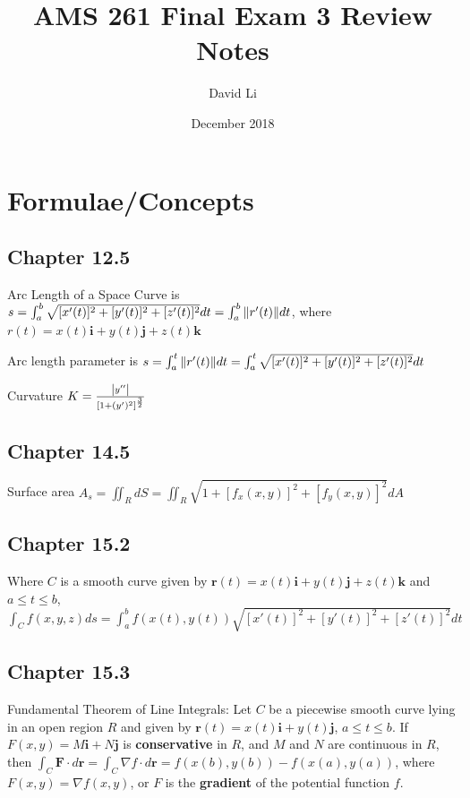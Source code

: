 \documentclass{article}
\title{AMS 261 Final Exam 3 Review Notes}
\author{David Li}
\date{December 2018}
\begin{document}
\maketitle

\section{Formulae/Concepts}

\subsection{Chapter 12.5}
\par\noindent\Large Arc Length of a Space Curve is $s = \int_{a}^{b}\sqrt{[x'(t)]^{2} + [y'(t)]^{2} + [z'(t)]^{2}}dt = \int_{a}^{b}\norm{r'(t)}dt$, where $r(t) = x(t)\textbf{i} + y(t)\textbf{j} + z(t)\textbf{k}$

\par\noindent\Large Arc length parameter is $s = \int_{a}^{t}\norm{r'(t)}dt = \int_{a}^{t}\sqrt{[x'(t)]^{2} + [y'(t)]^{2} + [z'(t)]^{2}}dt$\vspace{0.25cm}

\par\noindent\Large Curvature $K = \frac{\abs{y''}}{[1 + (y')^{2}]^{\frac{3}{2}}}$

\subsection{Chapter 14.5}
\par\noindent\Large Surface area $A_{s} = \iint_{R}dS = \iint_{R}\sqrt{1 + [f_{x}(x, y)]^{2} + [f_{y}(x, y)]^{2}}dA$

\subsection{Chapter 15.2}
\par\noindent\Large Where $C$ is a smooth curve given by $\textbf{r}(t) = x(t)\textbf{i} + y(t)\textbf{j} + z(t)\textbf{k}$ and $a \leq t \leq b$, $\int_{C}f(x, y, z)ds = \int_{a}^{b}f(x(t), y(t))\sqrt{[x'(t)]^{2} + [y'(t)]^{2} + [z'(t)]^{2}}dt$

\subsection{Chapter 15.3}
\par\noindent\Large Fundamental Theorem of Line Integrals: Let $C$ be a piecewise smooth curve lying in an open region $R$ and given by $\textbf{r}(t) = x(t)\textbf{i} + y(t)\textbf{j}$, $a \leq t \leq b$.  If $F(x, y) = M\textbf{i} + N\textbf{j}$ is \textbf{conservative} in $R$, and $M$ and $N$ are continuous in $R$, then $\int_{C}\textbf{F}\cdot d\textbf{r} = \int_{C}\nabla f\cdot d\textbf{r} = f(x(b), y(b)) - f(x(a), y(a))$, where $F(x, y) = \nabla f(x, y)$, or $F$ is the \textbf{gradient} of the potential function $f$.\vspace{0.25cm}
\end{document}
